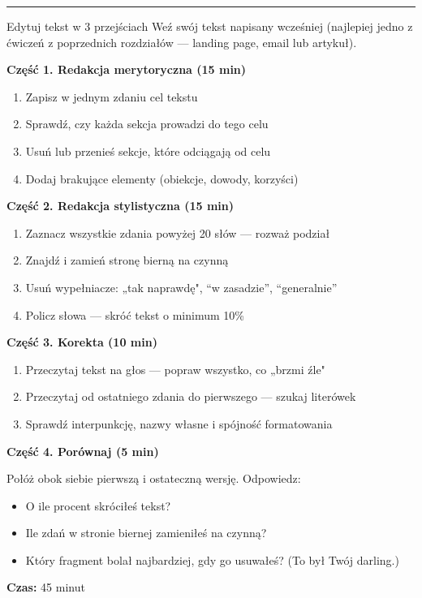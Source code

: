 \documentclass[
  12pt,
  a4paper,
  twoside,
  openright,
  12pt,
  DIV=12,
  BCOR=12mm]{scrbook}
\newcommand{\decoline}{%
  \begin{center}
    \textcolor{bordergray}{\rule{0.3\textwidth}{0.5pt}}
  \end{center}
}
\begin{document}
\decoline

\begin{cwiczenie}{Edytuj tekst w 3 przejściach}
Weź swój tekst napisany wcześniej (najlepiej jedno z ćwiczeń z poprzednich rozdziałów --- landing page, email lub artykuł).

\textbf{Część 1. Redakcja merytoryczna (15 min)}
\begin{enumerate}
  \item Zapisz w jednym zdaniu cel tekstu
  \item Sprawdź, czy każda sekcja prowadzi do tego celu
  \item Usuń lub przenieś sekcje, które odciągają od celu
  \item Dodaj brakujące elementy (obiekcje, dowody, korzyści)
\end{enumerate}

\textbf{Część 2. Redakcja stylistyczna (15 min)}
\begin{enumerate}
  \item Zaznacz wszystkie zdania powyżej 20 słów --- rozważ podział
  \item Znajdź i zamień stronę bierną na czynną
  \item Usuń wypełniacze: „tak naprawdę", ``w zasadzie'', ``generalnie''
  \item Policz słowa --- skróć tekst o minimum 10\%
\end{enumerate}

\textbf{Część 3. Korekta (10 min)}
\begin{enumerate}
  \item Przeczytaj tekst na głos --- popraw wszystko, co „brzmi źle"
  \item Przeczytaj od ostatniego zdania do pierwszego --- szukaj literówek
  \item Sprawdź interpunkcję, nazwy własne i spójność formatowania
\end{enumerate}

\textbf{Część 4. Porównaj (5 min)}

Połóż obok siebie pierwszą i ostateczną wersję. Odpowiedz:
\begin{itemize}
  \item O ile procent skróciłeś tekst?
  \item Ile zdań w stronie biernej zamieniłeś na czynną?
  \item Który fragment bolał najbardziej, gdy go usuwałeś? (To był Twój darling.)
\end{itemize}

\textbf{Czas:} 45 minut
\end{cwiczenie}
\end{document}
